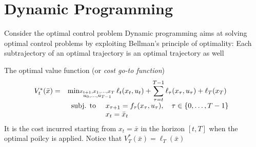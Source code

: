 \documentclass{book}
\theoremstyle{definition}
\theoremstyle{remark}
\theoremstyle{remark}
\begin{document}
\chapter{Dynamic Programming}
Consider the optimal control problem 
Dynamic programming aims at solving optimal control problems by exploiting Bellman's principle of optimality: Each subtrajectory of an optimal trajectory is an optimal trajectory as well

The optimal value function (or \emph{cost go-to function}) 
\begin{gather*}
    \begin{array}{r l}
        V_t^*(\bar{x})= & \min_{\substack{x_{t+1},x_1,\dots,x_T\\u_0,\dots,u_{T-1}}} \ell_t(x_t,u_t) + \displaystyle\sum_{\tau=t}^{T-1}\ell_\tau(x_\tau,u_\tau)+\ell_T(x_T)\\
                        & \begin{array}{l l }
                            \text{subj. to } & x_{\tau+1}=f_\tau(x_\tau,u_\tau), \quad \tau\in\{0,\dots,T-1\}\\
                                             & x_t = \bar{x}_t
                        \end{array}
    \end{array}
\end{gather*}
It is the cost incurred starting from $x_t=\bar{x}$ in the horizon $[t,T]$ when the optimal poilcy is applied. Notice that $V_T^*(\bar{x})=\ell_T(\bar{x})$
\end{document}
